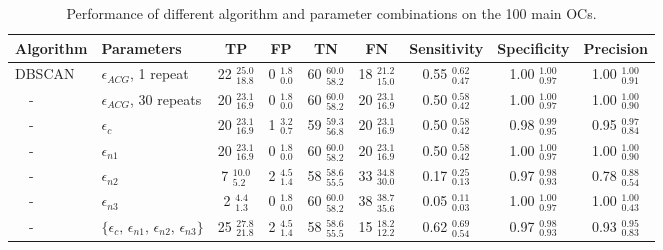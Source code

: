 \begin{table}
\caption[Performance of different algorithm and parameter combinations on the 100 main OCs]{Performance of different algorithm and parameter combinations on the 100 main OCs.}              %
\label{c2:table:classifications}      %
\centering                                      %
\begin{tabular}{l l | c c c c | c c c}          %
\hline\hline                        %

Algorithm & Parameters & TP & FP & TN & FN & Sensitivity & Specificity & Precision \\    
\hline
DBSCAN    & $\epsilon_{ACG}$, 1 repeat   & 22 $^{25.0}_{18.8}$ & 0 $^{1.8}_{0.0}$ & 60 $^{60.0}_{58.2}$ & 18 $^{21.2}_{15.0}$ & 0.55 $^{0.62}_{0.47}$ & 1.00 $^{1.00}_{0.97}$ & 1.00 $^{1.00}_{0.91}$ \rule{0pt}{0.35cm}\\[0.1cm]
$\quad$-  & $\epsilon_{ACG}$, 30 repeats & 20 $^{23.1}_{16.9}$ & 0 $^{1.8}_{0.0}$ & 60 $^{60.0}_{58.2}$ & 20 $^{23.1}_{16.9}$ & 0.50 $^{0.58}_{0.42}$ & 1.00 $^{1.00}_{0.97}$ & 1.00 $^{1.00}_{0.90}$ \\[0.1cm]
$\quad$-  & $\epsilon_{c}$               & 20 $^{23.1}_{16.9}$ & 1 $^{3.2}_{0.7}$ & 59 $^{59.3}_{56.8}$ & 20 $^{23.1}_{16.9}$ & 0.50 $^{0.58}_{0.42}$ & 0.98 $^{0.99}_{0.95}$ & 0.95 $^{0.97}_{0.84}$ \\[0.1cm]
$\quad$-  & $\epsilon_{n1}$              & 20 $^{23.1}_{16.9}$ & 0 $^{1.8}_{0.0}$ & 60 $^{60.0}_{58.2}$ & 20 $^{23.1}_{16.9}$ & 0.50 $^{0.58}_{0.42}$ & 1.00 $^{1.00}_{0.97}$ & 1.00 $^{1.00}_{0.90}$ \\[0.1cm]
$\quad$-  & $\epsilon_{n2}$              & 7 $^{10.0}_{5.2}$ & 2 $^{4.5}_{1.4}$ & 58 $^{58.6}_{55.5}$ & 33 $^{34.8}_{30.0}$ & 0.17 $^{0.25}_{0.13}$ & 0.97 $^{0.98}_{0.93}$ & 0.78 $^{0.88}_{0.54}$ \\[0.1cm]
$\quad$-  & $\epsilon_{n3}$              & 2 $^{4.4}_{1.3}$ & 0 $^{1.8}_{0.0}$ & 60 $^{60.0}_{58.2}$ & 38 $^{38.7}_{35.6}$ & 0.05 $^{0.11}_{0.03}$ & 1.00 $^{1.00}_{0.97}$ & 1.00 $^{1.00}_{0.43}$ \\[0.1cm]
$\quad$-  & $\{ \epsilon_{c}, \, \epsilon_{n1}, \, \epsilon_{n2}, \, \epsilon_{n3} \} $ & 25 $^{27.8}_{21.8}$ & 2 $^{4.5}_{1.4}$ & 58 $^{58.6}_{55.5}$ & 15 $^{18.2}_{12.2}$ & 0.62 $^{0.69}_{0.54}$ & 0.97 $^{0.98}_{0.93}$ & 0.93 $^{0.95}_{0.83}$ \\[0.1cm]


\end{tabular}
\end{table}
